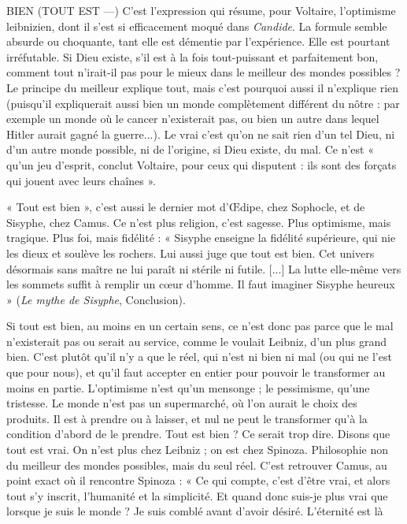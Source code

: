 BIEN (TOUT EST —) C'est l’expression qui résume, pour Voltaire, l’optimisme
leibnizien, dont il s’est si efficacement moqué
dans {\it Candide}. La formule semble absurde ou choquante, tant elle est démentie
par l'expérience. Elle est pourtant irréfutable. Si Dieu existe, s’il est à la fois
tout-puissant et parfaitement bon, comment tout n'irait-il pas pour le mieux
dans le meilleur des mondes possibles ? Le principe du meilleur explique tout,
mais c’est pourquoi aussi il n’explique rien (puisqu'il expliquerait aussi bien un
monde complètement différent du nôtre : par exemple un monde où le cancer
n’existerait pas, ou bien un autre dans lequel Hitler aurait gagné la guerre...).
Le vrai c’est qu’on ne sait rien d’un tel Dieu, ni d’un autre monde possible, ni
de l’origine, si Dieu existe, du mal. Ce n’est « qu’un jeu d’esprit, conclut Voltaire,
pour ceux qui disputent : ils sont des forçats qui jouent avec leurs
chaînes ».

« Tout est bien », c’est aussi le dernier mot d'Œdipe, chez Sophocle, et de
Sisyphe, chez Camus. Ce n’est plus religion, c’est sagesse. Plus optimisme, mais
tragique. Plus foi, mais fidélité : « Sisyphe enseigne la fidélité supérieure, qui
nie les dieux et soulève les rochers. Lui aussi juge que tout est bien. Cet univers
désormais sans maître ne lui paraît ni stérile ni futile. [...] La lutte elle-même
vers les sommets suffit à remplir un cœur d’homme. Il faut imaginer Sisyphe
heureux » ({\it Le mythe de Sisyphe}, Conclusion).

Si tout est bien, au moins en un certain sens, ce n’est donc pas parce que le
mal n’existerait pas ou serait au service, comme le voulait Leibniz, d’un plus
grand bien. C’est plutôt qu’il n’y a que le réel, qui n’est ni bien ni mal (ou qui
ne l’est que pour nous), et qu’il faut accepter en entier pour pouvoir le transformer
au moins en partie. L’optimisme n’est qu’un mensonge ; le pessimisme,
qu’une tristesse. Le monde n’est pas un supermarché, où l’on aurait le choix des
produits. Il est à prendre ou à laisser, et nul ne peut le transformer qu’à la
condition d’abord de le prendre. Tout est bien ? Ce serait trop dire. Disons que
tout est vrai. On n’est plus chez Leibniz ; on est chez Spinoza. Philosophie non
du meilleur des mondes possibles, mais du seul réel. C’est retrouver Camus, au
point exact où il rencontre Spinoza : « Ce qui compte, c’est d’être vrai, et alors
tout s’y inscrit, l'humanité et la simplicité. Et quand donc suis-je plus vrai que
lorsque je suis le monde ? Je suis comblé avant d’avoir désiré. L’éternité est là


